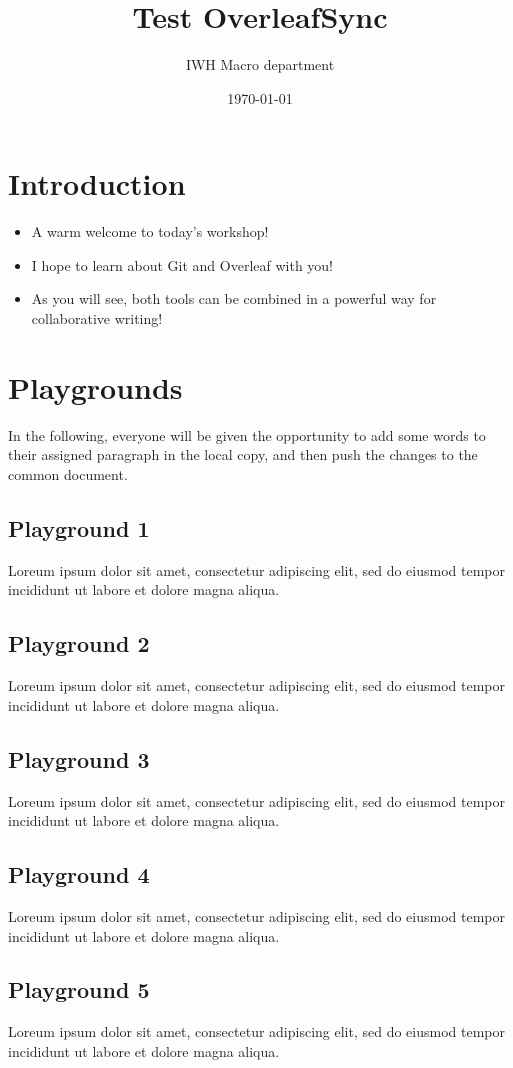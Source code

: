 \documentclass{article}
\title{Test OverleafSync}
\author{IWH Macro department}
\date{\today}
\begin{document}
\maketitle

\section{Introduction}

\begin{itemize} 
    \item A warm welcome to today's workshop!
    \item I hope to learn about Git and Overleaf with you!
    \item As you will see, both tools can be combined in a powerful way for collaborative writing!
\end{itemize}

\section{Playgrounds}
In the following, everyone will be given the opportunity to add some words to their assigned paragraph in the local copy, and then push the changes to the common document.

\subsection{Playground 1}
Loreum ipsum dolor sit amet, consectetur adipiscing elit, sed do eiusmod tempor incididunt ut labore et dolore magna aliqua.
\subsection{Playground 2}
Loreum ipsum dolor sit amet, consectetur adipiscing elit, sed do eiusmod tempor incididunt ut labore et dolore magna aliqua.
\subsection{Playground 3}
Loreum ipsum dolor sit amet, consectetur adipiscing elit, sed do eiusmod tempor incididunt ut labore et dolore magna aliqua.
\subsection{Playground 4}
Loreum ipsum dolor sit amet, consectetur adipiscing elit, sed do eiusmod tempor incididunt ut labore et dolore magna aliqua.
\subsection{Playground 5}
Loreum ipsum dolor sit amet, consectetur adipiscing elit, sed do eiusmod tempor incididunt ut labore et dolore magna aliqua.
\end{document}
